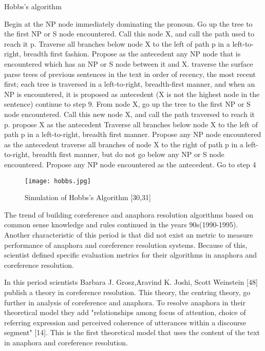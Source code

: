 \newpage
\begin{algorithm}[H]
\caption{Hobbs's algorithm}\label{alg:Hobbs}
\begin{algorithmic}[1]
\State Begin at the NP node immediately dominating the pronoun.
\State Go up the tree to the first NP or S node encountered. Call this node X, and call the path used to reach it p.
\State Traverse all branches below node X to the left of path p in a left-to-right, breadth first fashion. Propose as the antecedent any NP node that is encountered which has
an NP or S node between it and X.
	\State traverse the surface parse trees of previous sentences in the text in order of recency, the most recent first; each tree is traversed in a left-to-right, breadth-first manner, and when an NP is encountered, it is proposed as antecedent
\Else
	\State (X is not the highest node in the sentence) continue to step 9.
\EndIf
\State From node X, go up the tree to the first NP or S node encountered. Call this new node X, and call the path traversed to reach it p.
     \State propose X as the antecedent
\EndIf
\State Traverse all branches below node X to the left of path p in a left-to-right, breadth first manner. Propose any NP node encountered as the antecedent
    \State traverse all branches of node X to the right of path p in a left-to-right, breadth first manner, but do not go below any NP or S node encountered.
    \State Propose any NP node encountered as the antecedent.
\EndIf
\State Go to step 4
\end{algorithmic}
\end{algorithm}

\begin{figure}[h]
	\texttt{[image: hobbs.jpg]} 
 	\caption{Simulation of Hobbs's Algorithm [30,31] }
	\label{Figure 5}
\end{figure}

The trend of building coreference and anaphora resolution algorithms based on common sense knowledge and rules continued in the years 90s(1990-1995). Another characteristic of this period is that did not exist an metric to measure performance of anaphora and coreference resolution systems. Because of this, scientist defined specific evaluation metrics for their algorithms in anaphora and coreference resolution.

In this period scientists Barbara J. Grosz,Aravind K. Joshi, Scott Weinstein [48] publish a theory in coreference resolution. This theory, the centring theory, go further in analysis of coreference and anaphora. To resolve anaphora in their theoretical model they add "relationships among focus of attention, choice of referring expression and perceived coherence of utterances within a discourse segment" [14]. This is the first theoretical model that uses the content of the text in anaphora and coreference resolution.

